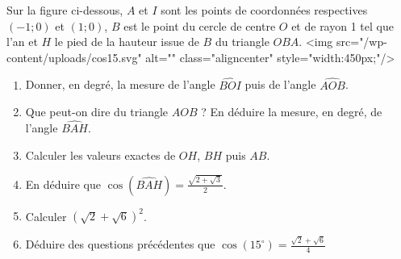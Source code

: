 
%
Sur la figure ci-dessous, $A$ et $I$ sont les points de coordonnées respectives $(-1;0)$ et $(1;0)$, $B$ est le point du cercle de centre $ O $ et de rayon 1 tel que l'an et $H$ le pied de la hauteur issue de $B$ du triangle $OBA$.
<img src="/wp-content/uploads/cos15.svg" alt="" class="aligncenter" style="width:450px;"/>

\begin{center}
\end{center}
\begin{enumerate}
     \item
     Donner, en degré, la mesure de l'angle $ \widehat{BOI} $ puis de l'angle $\widehat{AOB}$.
     \item
     Que peut-on dire du triangle $AOB$ ? En déduire la mesure, en degré, de l'angle $\widehat{BAH}$.
     \item
     Calculer les valeurs exactes de $OH$, $BH$ puis $AB$.
     \item
     En déduire que $\cos(\widehat{BAH}) = \frac{\sqrt{2+\sqrt{3}}}{2}$.
     \item
     Calculer $( \sqrt{2} +  \sqrt{6})^2  $.
     \item
     Déduire des questions précédentes que $\cos(15^{\circ})=  \frac{ \sqrt{2} +  \sqrt{6}}{4}  $
\end{enumerate}
